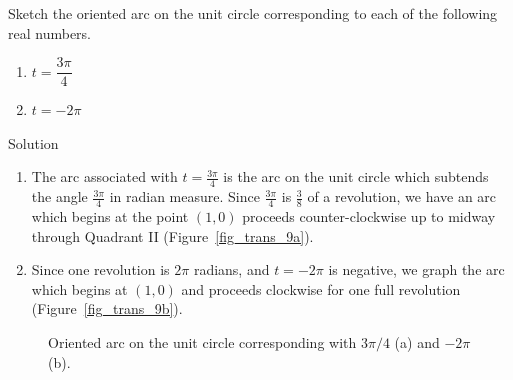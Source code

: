 \ifvc
\begin{example}
 Sketch the oriented arc on the unit circle corresponding to each of the following real numbers.  

\begin{multicols}{2}
\begin{enumerate}

\item $t=\dfrac{3 \pi}{4}$

\item $t =  - 2 \pi$

\end{enumerate}
\end{multicols}

Solution 

\begin{enumerate}

\item  The arc associated with $t = \frac{3 \pi}{4}$ is the arc on the unit circle which subtends the angle $\frac{3 \pi}{4}$ in radian measure.  Since $\frac{3 \pi}{4}$ is $\frac{3}{8}$ of a revolution, we have an arc which begins at the point $(1,0)$ proceeds counter-clockwise up to midway through Quadrant II (Figure~\ref{fig_trans_9a}).

\item Since one revolution is $2\pi$ radians, and $t=-2\pi$ is negative, we graph  the arc which begins at $(1,0)$ and proceeds clockwise for one full revolution (Figure~\ref{fig_trans_9b}).

\end{enumerate}
\begin{figure}[H]
\centering
\centerline{
\hspace{0.1cm}
}
\caption{Oriented arc on the unit circle corresponding with $3\pi/4$ (a) and $-2\pi$ (b). }


\end{figure}
\end{example}
